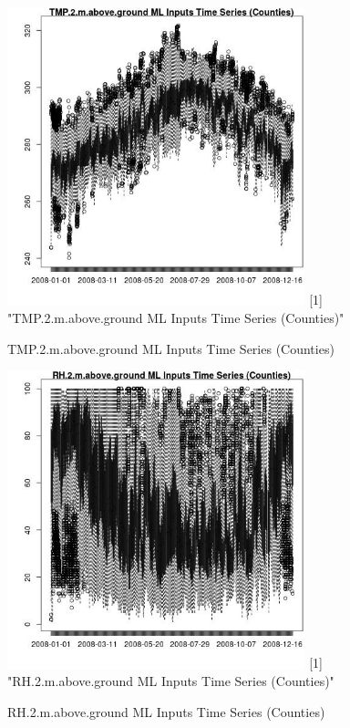 \begin{figure} 
\centering  
\includegraphics[width=0.77\textwidth]{Code_Outputs/ML_input_report_ML_input_CountyGeometricCentroids_Locations_Dates_part_c_2008-01-01to2008-12-31_TMP.2.m.above.groundTS.jpg} 
[1] "TMP.2.m.above.ground ML Inputs Time Series (Counties)"
\caption{\label{fig:ML_input_report_ML_input_CountyGeometricCentroids_Locations_Dates_part_c_2008-01-01to2008-12-31TMP.2.m.above.groundTS}TMP.2.m.above.ground ML Inputs Time Series (Counties)} 
\end{figure} 
 

\begin{figure} 
\centering  
\includegraphics[width=0.77\textwidth]{Code_Outputs/ML_input_report_ML_input_CountyGeometricCentroids_Locations_Dates_part_c_2008-01-01to2008-12-31_RH.2.m.above.groundTS.jpg} 
[1] "RH.2.m.above.ground ML Inputs Time Series (Counties)"
\caption{\label{fig:ML_input_report_ML_input_CountyGeometricCentroids_Locations_Dates_part_c_2008-01-01to2008-12-31RH.2.m.above.groundTS}RH.2.m.above.ground ML Inputs Time Series (Counties)} 
\end{figure} 
 

